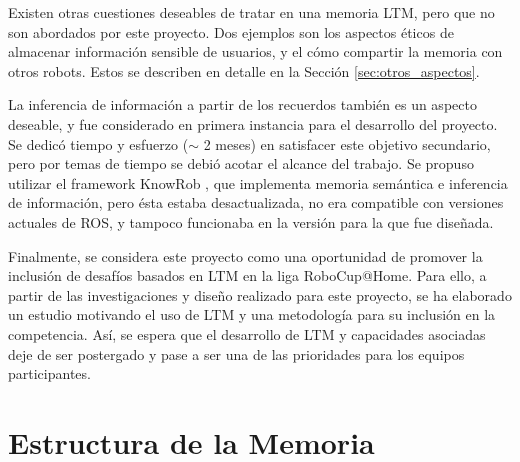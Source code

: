 Existen otras cuestiones deseables de tratar en una memoria LTM, pero que no son abordados por este proyecto. Dos ejemplos son los aspectos éticos de almacenar información sensible de usuarios, y el cómo compartir la memoria con otros robots. Estos se describen en detalle en la Sección \ref{sec:otros_aspectos}.

La inferencia de información a partir de los recuerdos también es un aspecto deseable, y fue considerado en primera instancia para el desarrollo del proyecto. Se dedicó tiempo y esfuerzo ($\sim$ 2 meses) en satisfacer este objetivo secundario, pero por temas de tiempo se debió acotar el alcance del trabajo. Se propuso utilizar el framework KnowRob \cite{Tenorth2009,Tenorth2013,Winkler2014}, que implementa memoria semántica e inferencia de información, pero ésta estaba desactualizada, no era compatible con versiones actuales de ROS, y tampoco funcionaba en la versión para la que fue diseñada.

Finalmente, se considera este proyecto como una oportunidad de promover la inclusión de desafíos basados en LTM en la liga RoboCup@Home. Para ello, a partir de las investigaciones y diseño realizado para este proyecto, se ha elaborado un estudio \cite{ltm_in_robocup} motivando el uso de LTM y una metodología para su inclusión en la competencia. Así, se espera que el desarrollo de LTM y capacidades asociadas deje de ser postergado y pase a ser una de las prioridades para los equipos participantes.

\vfill



\section{Estructura de la Memoria}

